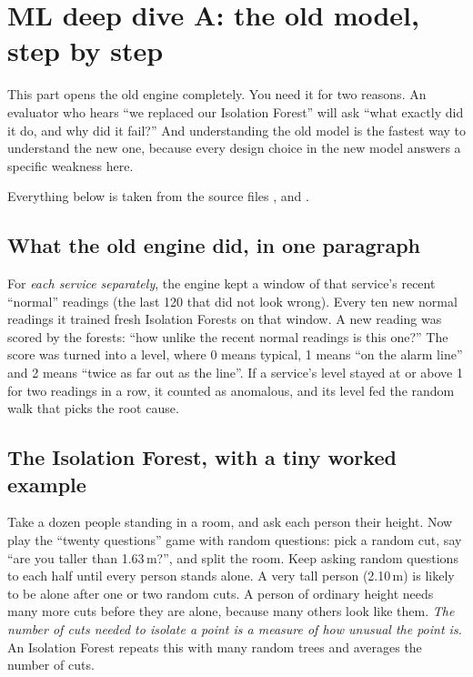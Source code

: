 \chapter{ML deep dive A: the old model, step by step}
\label{ch:deepforest}

This part opens the old engine completely. You need it for two reasons. An evaluator who hears ``we replaced our Isolation Forest'' will ask ``what exactly did it do, and why did it fail?'' And understanding the old model is the fastest way to understand the new one, because every design choice in the new model answers a specific weakness here.

Everything below is taken from the source files ,  and .

\section{What the old engine did, in one paragraph}
\begin{simplebox}
For \emph{each service separately}, the engine kept a window of that service's recent ``normal'' readings (the last 120 that did not look wrong). Every ten new normal readings it trained fresh Isolation Forests on that window. A new reading was scored by the forests: ``how unlike the recent normal readings is this one?'' The score was turned into a level, where 0 means typical, 1 means ``on the alarm line'' and 2 means ``twice as far out as the line''. If a service's level stayed at or above 1 for two readings in a row, it counted as anomalous, and its level fed the random walk that picks the root cause.
\end{simplebox}

\section{The Isolation Forest, with a tiny worked example}
\begin{simplebox}
Take a dozen people standing in a room, and ask each person their height. Now play the ``twenty questions'' game with random questions: pick a random cut, say ``are you taller than 1.63\,m?'', and split the room. Keep asking random questions to each half until every person stands alone. A very tall person (2.10\,m) is likely to be alone after one or two random cuts. A person of ordinary height needs many more cuts before they are alone, because many others look like them. \emph{The number of cuts needed to isolate a point is a measure of how unusual the point is.} An Isolation Forest repeats this with many random trees and averages the number of cuts.
\end{simplebox}

